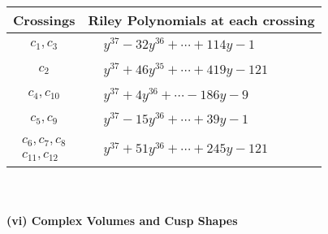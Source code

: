\documentclass[1p]{elsarticle_modified}
\theoremstyle{definition}
\begin{document}
\begin{tabular}{m{50pt}|m{274pt}}
Crossings & \hspace{64pt}Riley Polynomials at each crossing \\
\hline $$\begin{aligned}c_{1},c_{3}\end{aligned}$$&$\begin{aligned}
&y^{37}-32 y^{36}+\cdots+114 y-1
\end{aligned}$\\
\hline $$\begin{aligned}c_{2}\end{aligned}$$&$\begin{aligned}
&y^{37}+46 y^{35}+\cdots+419 y-121
\end{aligned}$\\
\hline $$\begin{aligned}c_{4},c_{10}\end{aligned}$$&$\begin{aligned}
&y^{37}+4 y^{36}+\cdots-186 y-9
\end{aligned}$\\
\hline $$\begin{aligned}c_{5},c_{9}\end{aligned}$$&$\begin{aligned}
&y^{37}-15 y^{36}+\cdots+39 y-1
\end{aligned}$\\
\hline $$\begin{aligned}c_{6},c_{7},c_{8}\\c_{11},c_{12}\end{aligned}$$&$\begin{aligned}
&y^{37}+51 y^{36}+\cdots+245 y-121
\end{aligned}$\\
\hline
\end{tabular}\\~\\
\newpage\flushleft \textbf{(vi) Complex Volumes and Cusp Shapes}
\end{document}
